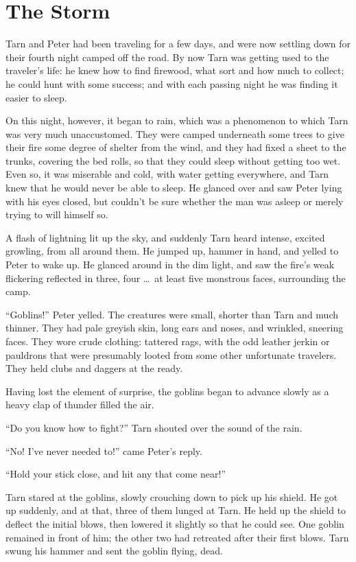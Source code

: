 \chapter{The Storm}
Tarn and Peter had been traveling for a few days, and were now settling down for their fourth night camped off the road.  By now Tarn was getting used to the traveler's life: he knew how to find firewood, what sort and how much to collect; he could hunt with some success; and with each passing night he was finding it easier to sleep.

On this night, however, it began to rain, which was a phenomenon to which Tarn was very much unaccustomed.  They were camped underneath some trees to give their fire some degree of shelter from the wind, and they had fixed a sheet to the trunks, covering the bed rolls, so that they could sleep without getting too wet.  Even so, it was miserable and cold, with water getting everywhere, and Tarn knew that he would never be able to sleep.  He glanced over and saw Peter lying with his eyes closed, but couldn't be sure whether the man was asleep or merely trying to will himself so.

A flash of lightning lit up the sky, and suddenly Tarn heard intense, excited growling, from all around them.  He jumped up, hammer in hand, and yelled to Peter to wake up.  He glanced around in the dim light, and saw the fire's weak flickering reflected in three, four \ldots\  at least five monstrous faces, surrounding the camp.

``Goblins!'' Peter yelled.  The creatures were small, shorter than Tarn and much thinner.  They had pale greyish skin, long ears and noses, and wrinkled, sneering faces.  They wore crude clothing: tattered rags, with the odd leather jerkin or pauldrons that were presumably looted from some other unfortunate travelers.  They held clubs and daggers at the ready.

Having lost the element of surprise, the goblins began to advance slowly as a heavy clap of thunder filled the air.

``Do you know how to fight?'' Tarn shouted over the sound of the rain.

``No!  I've never needed to!'' came Peter's reply.

``Hold your stick close, and hit any that come near!''

Tarn stared at the goblins, slowly crouching down to pick up his shield.  He got up suddenly, and at that, three of them lunged at Tarn.  He held up the shield to deflect the initial blows, then lowered it slightly so that he could see.  One goblin remained in front of him; the other two had retreated after their first blows.  Tarn swung his hammer and sent the goblin flying, dead.

